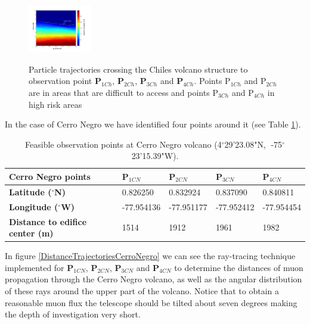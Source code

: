\documentclass[letterpaper,10pt,titlepage,linenumber]{article}
\begin{document}
\begin{figure}[!h]
{\includegraphics[width=0.245\textwidth]{Figures/Distance4CH}}
	\caption{Particle trajectories crossing  the Chiles volcano structure to observation point {\bf P$_{1Ch}$}, {\bf P$_{2Ch}$}, {\bf P$_{3Ch}$} and {\bf P$_{4Ch}$}. Points P$_{1Ch}$ and P$_{2Ch}$ are in areas that are difficult to access and points P$_{3Ch}$ and P$_{4Ch}$ in high risk areas}
  \label{DistanceTrajectoriesChiles}
\end{figure}

In the case of Cerro Negro we have identified four points around it  (see Table \ref{TableCerroNegro}).
\begin{table}[!h]
\centering
\begin{tabular}{lllll}
\hline
\textbf{Cerro Negro points}        & \textbf{P$_{1CN}$}& \textbf{P$_{2CN}$} & \textbf{P$_{3CN}$} & \textbf{P$_{4CN}$} \\ \hline
\textbf{Latitude  ($^{\circ}$N)}        & 0.826250           & 0.832924         & 0.837090        & 0.840811     \\
\textbf{Longitude ($^{\circ}$W)}        & -77.954136         & -77.951177       & -77.952412       & -77.954454    \\
\textbf{Distance to edifice center (m)} & 1514               & 1912              & 1961              & 1982       \\ 
\hline
\end{tabular}
	\caption{Feasible observation points at Cerro Negro volcano (4$^{\circ}$29'23.08"N,$\;$ -75$^{\circ}$23'15.39"W). }
\label{TableCerroNegro}
\end{table}

In figure \ref{DistanceTrajectoriesCerroNegro} we can see the ray-tracing technique implemented for {\bf P$_{1CN}$}, {\bf P$_{2CN}$}, {\bf P$_{3CN}$} and {\bf P$_{4CN}$} to determine the distances of muon propagation through the Cerro Negro volcano, as well as the angular distribution of these rays around the upper part of the volcano. Notice that to obtain a reasonable muon flux the telescope should be tilted about seven degrees making the depth of investigation very short. 
\end{document}
